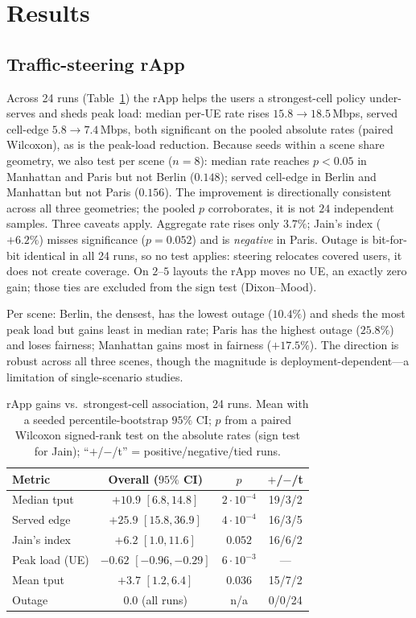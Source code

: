 \documentclass[conference]{IEEEtran}
\begin{document}
\section{Results}
\label{sec:results}
\subsection{Traffic-steering rApp}
Across 24 runs (Table~\ref{tab:results}) the rApp helps the users a strongest-cell policy under-serves and sheds peak load: median per-UE rate rises $15.8\to18.5$\,Mbps, served cell-edge $5.8\to7.4$\,Mbps, both significant on the pooled absolute rates (paired Wilcoxon), as is the peak-load reduction. Because seeds within a scene share geometry, we also test per scene ($n{=}8$): median rate reaches $p{<}0.05$ in Manhattan and Paris but not Berlin ($0.148$); served cell-edge in Berlin and Manhattan but not Paris ($0.156$). The improvement is directionally consistent across all three geometries; the pooled $p$ corroborates, it is not $24$ independent samples. Three caveats apply. Aggregate rate rises only $3.7\%$; Jain's index ($+6.2\%$) misses significance ($p{=}0.052$) and is \emph{negative} in Paris. Outage is bit-for-bit identical in all 24 runs, so no test applies: steering relocates covered users, it does not create coverage. On $2$--$5$ layouts the rApp moves no UE, an exactly zero gain; those ties are excluded from the sign test (Dixon--Mood).

Per scene: Berlin, the densest, has the lowest outage ($10.4\%$) and sheds the most peak load but gains least in median rate; Paris has the highest outage ($25.8\%$) and loses fairness; Manhattan gains most in fairness ($+17.5\%$). The direction is robust across all three scenes, though the magnitude is deployment-dependent---a limitation of single-scenario studies.

\begin{table}[tb]
\caption{rApp gains vs.\ strongest-cell association, 24 runs. Mean with a seeded percentile-bootstrap $95\%$ CI; $p$ from a paired Wilcoxon signed-rank test on the absolute rates (sign test for Jain); ``$+$/$-$/t'' = positive/negative/tied runs.}
\label{tab:results}
\centering
\footnotesize
\setlength{\tabcolsep}{4pt}
\begin{tabular}{@{}lccc@{}}
\toprule
Metric & Overall ($95\%$ CI) & $p$ & $+$/$-$/t \\
\midrule
Median tput & $+10.9$ $[6.8, 14.8]$ & $2{\cdot}10^{-4}$ & 19/3/2 \\
Served edge & $+25.9$ $[15.8, 36.9]$ & $4{\cdot}10^{-4}$ & 16/3/5 \\
Jain's index  & $+6.2$ $[1.0, 11.6]$  & $0.052$ & 16/6/2 \\
Peak load (UE) & $-0.62$ $[-0.96, -0.29]$ & $6{\cdot}10^{-3}$ & --- \\
Mean tput & $+3.7$ $[1.2, 6.4]$ & $0.036$ & 15/7/2 \\
Outage & $0.0$ (all runs) & n/a & 0/0/24 \\
\bottomrule
\end{tabular}
\end{table}
\end{document}
